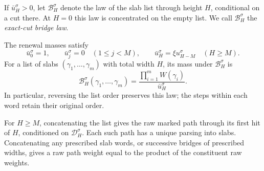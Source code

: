 If $\bar u_H^\sigma>0$, let $\mathcal B_H^\sigma$ denote the law of the slab
list through height $H$, conditional on a cut there. At $H=0$ this law is
concentrated on the empty list. We call $\mathcal B_H^\sigma$ the
\emph{exact-cut bridge law}.

\begin{proposition}
\label{prop:exact-cut-bridges}
The renewal masses satisfy
\begin{equation}
 \bar u_0^\sigma=1,\qquad
 \bar u_j^\sigma=0\quad(1\le j<M),\qquad
 \bar u_H^\sigma=\xi u_{H-M}^\sigma\quad(H\ge M).
 \label{eq:bridge-renewal}
\end{equation}
For a list of slabs $(\gamma_1,\ldots,\gamma_m)$ with total width $H$, its
mass under $\mathcal B_H^\sigma$ is
\begin{equation}
 \mathcal B_H^\sigma(\gamma_1,\ldots,\gamma_m)
   =\frac{\prod_{i=1}^m W(\gamma_i)}{\bar u_H^\sigma}.
 \label{eq:bridge-law}
\end{equation}
In particular, reversing the list order preserves this law; the steps
within each word retain their original order.

For $H\ge M$, concatenating the list gives the raw marked path through its
first hit of $H$, conditioned on $\mathcal D_H^\sigma$. Each such path has
a unique parsing into slabs. Concatenating any prescribed slab words, or
successive bridges of prescribed widths, gives a raw path weight equal to
the product of the constituent raw weights.
\end{proposition}


